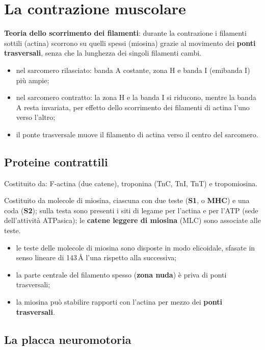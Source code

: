 \section{La contrazione muscolare}

\textbf{Teoria dello scorrimento dei filamenti}: durante la contrazione i filamenti sottili (actina) scorrono su quelli spessi (miosina) grazie al movimento dei \textbf{ponti trasversali}, senza che la lunghezza dei singoli filamenti cambi.
\begin{itemize}
  \item nel sarcomero rilasciato: banda A costante, zona H e banda I (emibanda I) più ampie;
  \item nel sarcomero contratto: la zona H e la banda I si riducono, mentre la banda A resta invariata, per effetto dello scorrimento dei filamenti di actina l'uno verso l'altro;
  \item il ponte trasversale muove il filamento di actina verso il centro del sarcomero.
\end{itemize}

\subsection{Proteine contrattili}

Costituito da: F-actina (due catene), troponina (TnC, TnI, TnT) e tropomiosina.

Costituito da molecole di miosina, ciascuna con due teste (\textbf{S1}, o \textbf{MHC}) e una coda (\textbf{S2}); sulla testa sono presenti i siti di legame per l'actina e per l'ATP (sede dell'attività ATPasica); le \textbf{catene leggere di miosina} (MLC) sono associate alle teste.
\begin{itemize}
  \item le teste delle molecole di miosina sono disposte in modo elicoidale, sfasate in senso lineare di 143\,\AA{} l'una rispetto alla successiva;
  \item la parte centrale del filamento spesso (\textbf{zona nuda}) è priva di ponti trasversali;
  \item la miosina può stabilire rapporti con l'actina per mezzo dei \textbf{ponti trasversali}.
\end{itemize}

\subsection{La placca neuromotoria}

